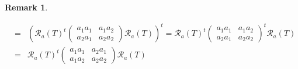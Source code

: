 \documentclass[aps,preprint]{revtex4}
\newtheorem{remark}[theorem]{Remark}
\begin{document}
\begin{remark}
\begin{enumerate}
\begin{eqnarray}
&=&\left( \mathcal{R}_{a}\left( T\right) ^{t}\left( 
\begin{array}{cc}
a_{1}a_{1} & a_{1}a_{2} \\ 
a_{2}a_{1} & a_{2}a_{2}%
\end{array}%
\right) \mathcal{R}_{a}\left( T\right) \right) ^{t}=\mathcal{R}_{a}\left(
T\right) ^{t}\left( 
\begin{array}{cc}
a_{1}a_{1} & a_{1}a_{2} \\ 
a_{2}a_{1} & a_{2}a_{2}%
\end{array}%
\right) ^{t}\mathcal{R}_{a}\left( T\right) \\
&=&\mathcal{R}_{a}\left( T\right) ^{t}\left( 
\begin{array}{cc}
a_{1}a_{1} & a_{2}a_{1} \\ 
a_{1}a_{2} & a_{2}a_{2}%
\end{array}%
\right) \mathcal{R}_{a}\left( T\right)
\end{eqnarray}
\end{enumerate}
\end{remark}
\end{document}
